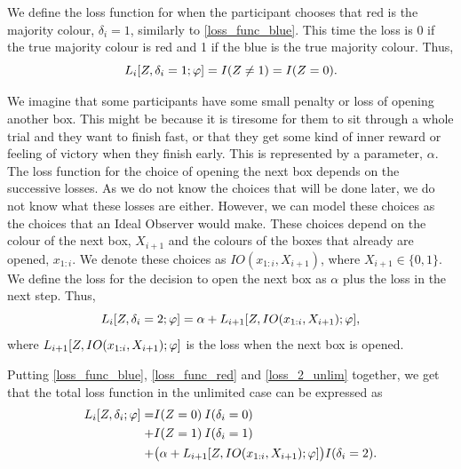 We define the loss function for when the participant chooses that red is the majority colour, $\delta_i=1$, similarly to \eqref{loss_func_blue}. This time the loss is 0 if the true majority colour is red and 1 if the blue is the true majority colour. Thus,
\begin{equation}
\label{loss_func_red}
    L_i[Z,\delta_i=1;\varphi] = I(Z\neq1)=I(Z=0).
\end{equation}

We imagine that some participants have some small penalty or loss of opening another box. This might be because it is tiresome for them to sit through a whole trial and they want to finish fast, or that they get some kind of inner reward or feeling of victory when they finish early. This is represented by a parameter, $\alpha$. 
The loss function for the choice of opening the next box depends on the successive losses. As we do not know the choices that will be done later, we do not know what these losses are either. However, we can model these choices as the choices that an Ideal Observer would make. These choices depend on the colour of the next box, $X_{i+1}$ and the colours of the boxes that already are opened, $x_{1:i}$. We denote these choices as $IO(x_{1:i},X_{i+1})$, where $X_{i+1} \in \{0,1\}$.
We define the loss for the decision to open the next box as $\alpha$ plus the loss in the next step. Thus, 
\begin{equation}
\label{loss_2_unlim}
    L_i[Z,\delta_i=2;\varphi] = \alpha + L_{i+1}[Z,IO(x_{1:i},X_{i+1});\varphi],
\end{equation}
where $L_{i+1}[Z,IO(x_{1:i},X_{i+1});\varphi]$ is the loss when the next box is opened. 


Putting \eqref{loss_func_blue}, \eqref{loss_func_red} and \eqref{loss_2_unlim} together, we get that the total loss function in the unlimited case can be expressed as
\begin{equation}
\label{tot_loss_unlim}
    \begin{aligned}
       L_i[Z,\delta_{i};\varphi] 
       =& I(Z=0)\: I(\delta_i=0) \\
       +& I(Z=1)\: I(\delta_i=1)\\
       +& \big(\alpha + L_{i+1}[Z,IO(x_{1:i},X_{i+1});\varphi] \big) I(\delta_i=2).
    \end{aligned}
\end{equation}

